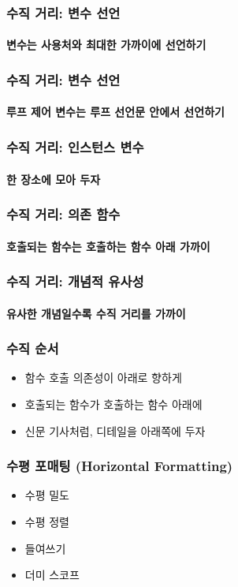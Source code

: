 \documentclass{beamer}
\begin{document}
\begin{frame}
    \frametitle{수직 거리: 변수 선언}
    \framesubtitle{변수는 사용처와 최대한 가까이에 선언하기}
    
\end{frame}

\begin{frame}
    \frametitle{수직 거리: 변수 선언}
    \framesubtitle{루프 제어 변수는 루프 선언문 안에서 선언하기}
    
\end{frame}

\begin{frame}
    \frametitle{수직 거리: 인스턴스 변수}
    \framesubtitle{한 장소에 모아 두자}
    
\end{frame}

\begin{frame}
    \frametitle{수직 거리: 의존 함수}
    \framesubtitle{호출되는 함수는 호출하는 함수 아래 가까이}
    
\end{frame}

\begin{frame}
    \frametitle{수직 거리: 개념적 유사성}
    \framesubtitle{유사한 개념일수록 수직 거리를 가까이}
    
\end{frame}

\begin{frame}
    \frametitle{수직 순서}
    \begin{itemize}
        \item 함수 호출 의존성이 아래로 향하게
        \item 호출되는 함수가 호출하는 함수 아래에
        \item 신문 기사처럼, 디테일을 아래쪽에 두자
    \end{itemize}
\end{frame}

\begin{frame}
    \frametitle{수평 포매팅 (Horizontal Formatting)}
    \begin{itemize}
        \item 수평 밀도
        \item 수평 정렬
        \item 들여쓰기
        \item 더미 스코프
    \end{itemize}
\end{frame}
\end{document}
